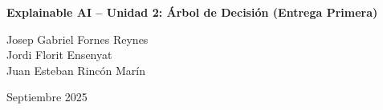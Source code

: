 \documentclass[11pt,a4paper]{article}
\begin{document}
\begin{titlepage}
  \thispagestyle{empty}
  \centering

  \vspace*{\fill} %

  {\Huge \textbf{Explainable AI – Unidad 2: Árbol de Decisión (Entrega Primera)}\par}
  \vspace{1cm}

  {\Large
  Josep Gabriel Fornes Reynes\\
  Jordi Florit Ensenyat\\
  Juan Esteban Rincón Marín\par}

  \vspace{1.2cm}

  {\large Septiembre 2025\par}

  \vspace*{\fill} %
\end{titlepage}

\clearpage









\printbibliography

% 
\end{document}
